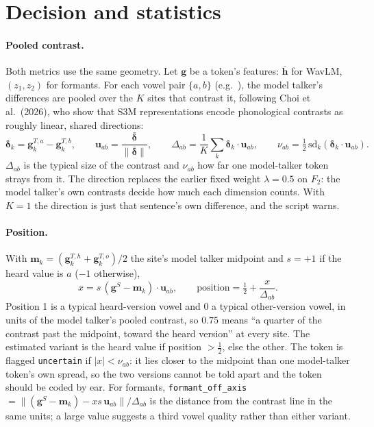 \documentclass[11pt]{article}
\begin{document}
\section{Decision and statistics}

\paragraph{Pooled contrast.} Both metrics use the same geometry. Let $\mathbf{g}$ be a token's features: $\bar{\mathbf{h}}$ for WavLM, $(z_1,z_2)$ for formants. For each vowel pair $\{a,b\}$ (e.g.\ ), the model talker's differences are pooled over the $K$ sites that contrast it, following Choi et al.\ (2026), who show that S3M representations encode phonological contrasts as roughly linear, shared directions:
\[
\boldsymbol\delta_k = \mathbf{g}^{T,a}_k - \mathbf{g}^{T,b}_k, \qquad
\mathbf{u}_{ab} = \frac{\bar{\boldsymbol\delta}}{\lVert\bar{\boldsymbol\delta}\rVert}, \qquad
\Delta_{ab} = \frac{1}{K}\sum_k \boldsymbol\delta_k\cdot\mathbf{u}_{ab}, \qquad
\nu_{ab} = \tfrac12\,\mathrm{sd}_k(\boldsymbol\delta_k\cdot\mathbf{u}_{ab}).
\]
$\Delta_{ab}$ is the typical size of the contrast and $\nu_{ab}$ how far one model-talker token strays from it. The direction replaces the earlier fixed weight $\lambda=0.5$ on $F_2$: the model talker's own contrasts decide how much each dimension counts. With $K=1$ the direction is just that sentence's own difference, and the script warns.

\paragraph{Position.} With $\mathbf{m}_k = (\mathbf{g}^{T,h}_k + \mathbf{g}^{T,o}_k)/2$ the site's model talker midpoint and $s=+1$ if the heard value is $a$ ($-1$ otherwise),
\[
x = s\,(\mathbf{g}^S - \mathbf{m}_k)\cdot\mathbf{u}_{ab}, \qquad
\text{position} = \tfrac12 + \frac{x}{\Delta_{ab}}.
\]
Position 1 is a typical heard-version vowel and 0 a typical other-version vowel, in units of the model talker's pooled contrast, so $0.75$ means ``a quarter of the contrast past the midpoint, toward the heard version'' at every site. The estimated variant is the heard value if position $>\tfrac12$, else the other. The token is flagged \texttt{uncertain} if $|x| < \nu_{ab}$: it lies closer to the midpoint than one model-talker token's own spread, so the two versions cannot be told apart and the token should be coded by ear. For formants, \texttt{formant\_off\_axis} $= \lVert(\mathbf{g}^S-\mathbf{m}_k) - x s\,\mathbf{u}_{ab}\rVert/\Delta_{ab}$ is the distance from the contrast line in the same units; a large value suggests a third vowel quality rather than either variant.
\end{document}
